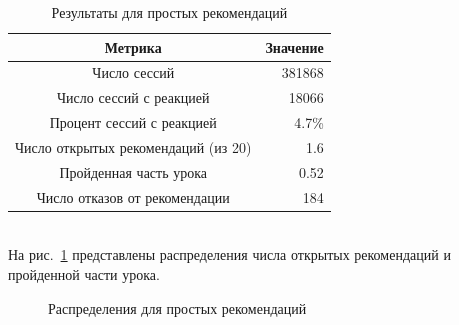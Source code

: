 \documentclass[14pt]{matmex-diploma}
\begin{document}
\begin{table}[h]
    \caption{Результаты для простых рекомендаций}
    \label{tabular:table_usual}
    
    \begin{center}
    \begin{tabular}{ c | r }
      \hline
      Метрика & Значение \\
      \hline	
      \hline
      Число сессий & 381868 \\
      Число сессий с реакцией & 18066 \\
      Процент сессий с реакцией &  4.7\% \\
      Число открытых рекомендаций (из 20) & 1.6 \\
      Пройденная часть урока & 0.52 \\
      Число отказов от рекомендации & 184 \\\hline
    \end{tabular}
    \end{center}
\end{table}

\\\indent На рис.~\ref{fig:usual_distibutions} представлены распределения числа открытых рекомендаций и пройденной части урока.

\begin{figure}[h]
  \centering
  \hfill
    \caption{Распределения для простых рекомендаций}
    \label{fig:usual_distibutions}
\end{figure}
\end{document}

